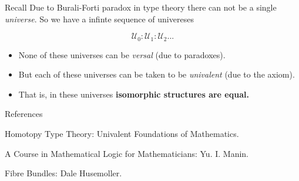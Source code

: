 \documentclass[10pt]{beamer}
\newcommand{\U}{\mathscr{U}}
\theoremstyle{definition}
\theoremstyle{definition}
\begin{document}
\begin{frame}

\begin{block}{Recall}
Due to Burali-Forti paradox in type theory there can not be a single \emph{universe}. So
we have a infinte sequence of univereses 

\[ \U_0 : \U_1 : \U_2 ...\]
\end{block}

\begin{block}{}
\begin{itemize}
\item None of these universes can be \emph{versal} (due to paradoxes).
\item But each of these universes can be taken to be \emph{univalent} (due to the axiom).
\item That is, in these universes \textbf{isomorphic structures are equal.}
\end{itemize}
\end{block}




\end{frame}


\begin{frame}{References}

\begin{thebibliography}{99}

Homotopy Type Theory: Univalent Foundations of Mathematics.

A Course in Mathematical Logic for Mathematicians: Yu. I. Manin. 

Fibre Bundles: Dale Husemoller.


\end{thebibliography}
\end{frame}
\end{document}
